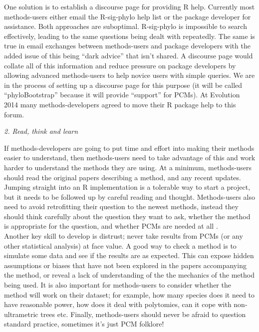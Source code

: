 \documentclass[a4paper,12pt]{article}
\renewcommand{\subsection}[1]{
  \bigskip
  \begin{center}
  \begin{large}
  \normalfont\itshape #1
  \end{large}
  \end{center}
}
\begin{document}
One solution is to establish a discourse page for providing R help. 
Currently most methods-users either email the R-sig-phylo help list or the package developer for assistance. 
Both approaches are suboptimal. 
R-sig-phylo is impossible to search effectively, leading to the same questions being dealt with repeatedly. 
The same is true in email exchanges between methods-users and package developers with the added issue of this being ``dark advice'' that isn't shared. 
A discourse page would collate all of this information and reduce pressure on package developers by allowing advanced methods-users to help novice users with simple queries. 
We are in the process of setting up a discourse page for this purpose (it will be called ``phyloBootstrap'' because it will provide ``support'' for PCMs). At Evolution 2014 many methods-developers agreed to move their R package help to this forum.

\subsection{2. Read, think and learn}
If methods-developers are going to put time and effort into making their methods easier to understand, then methods-users need to take advantage of this and work harder to understand the methods they are using. 
At a minimum, methods-users should read the original papers describing a method, and any recent updates. 
Jumping straight into an R implementation is a tolerable way to start a project, but it needs to be followed up by careful reading and thought. 
Methods-users also need to avoid retrofitting their question to the newest methods, instead they should think carefully about the question they want to ask, whether the method is appropriate for the question, and whether PCMs are
needed at all \citep{losos2011seeing}.\\

Another key skill to develop is distrust; never take results from PCMs (or any other statistical analysis) at face value. 
A good way to check a method is to simulate some data and see if the results are as expected. 
This can expose hidden assumptions or biases that have not been explored in the papers accompanying the method, or reveal a lack of understanding of the the mechanics of the method being used. 
It is also important for methods-users to consider whether the method will work on their dataset; for example, how many species does it need to have reasonable power, how does it deal with polytomies, can it cope with non-ultrametric trees etc.
Finally, methods-users should never be afraid to question standard practice, sometimes it's just PCM folklore!
\end{document}
